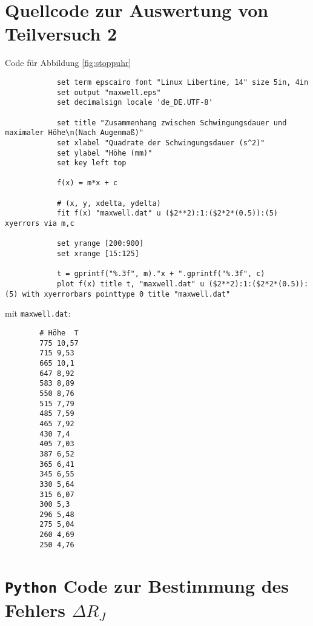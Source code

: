 \section{\gnuplot{} Quellcode zur Auswertung von Teilversuch 2}
    \label{appdx:gnuplotTV2}
    
    \gnuplot{} Code für Abbildung \ref{fig:stoppuhr}
    {  
        \renewcommand{\fcolorbox}[4][]{#4}
        \begin{verbatim}
            set term epscairo font "Linux Libertine, 14" size 5in, 4in
            set output "maxwell.eps"
            set decimalsign locale 'de_DE.UTF-8'

            set title "Zusammenhang zwischen Schwingungsdauer und maximaler Höhe\n(Nach Augenmaß)"
            set xlabel "Quadrate der Schwingungsdauer (s^2)"
            set ylabel "Höhe (mm)"
            set key left top

            f(x) = m*x + c

            # (x, y, xdelta, ydelta)
            fit f(x) "maxwell.dat" u ($2**2):1:($2*2*(0.5)):(5) xyerrors via m,c

            set yrange [200:900]
            set xrange [15:125]

            t = gprintf("%.3f", m)."x + ".gprintf("%.3f", c)
            plot f(x) title t, "maxwell.dat" u ($2**2):1:($2*2*(0.5)):(5) with xyerrorbars pointtype 0 title "maxwell.dat"
        \end{verbatim}
    }
    mit \texttt{maxwell.dat}:
    \begin{verbatim}
        # Höhe  T
        775 10,57
        715 9,53
        665 10,1
        647 8,92
        583 8,89
        550 8,76
        515 7,79
        485 7,59
        465 7,92
        430 7,4
        405 7,03
        387 6,52
        365 6,41
        345 6,55
        330 5,64
        315 6,07
        300 5,3
        296 5,48
        275 5,04
        260 4,69
        250 4,76
    \end{verbatim}

\section{\texttt{Python} Code zur Bestimmung des Fehlers $\Delta R_J$}
    \label{appdx:pythonTV2}

